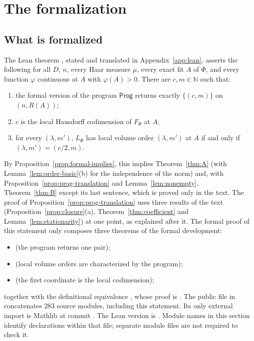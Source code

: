 \documentclass[11pt,a4paper]{article}
\theoremstyle{definition}
\theoremstyle{remark}
\numberwithin{equation}{section}
\newcommand{\N}{\mathbb{N}}
\newcommand{\Prog}{\mathsf{Prog}}
\begin{document}
\section{The formalization}\label{sec:formal}

\subsection{What is formalized}
The Lean theorem , stated and translated in Appendix~\ref{app:lean}, asserts the following for all $D$, $n$, every Haar measure $\mu$, every exact fit $A$ of $\Phi$, and every function $\varphi$ continuous at $A$ with $\varphi(A)>0$. There are $c,m\in\N$ such that:
\begin{enumerate}[label=(F\arabic*)]
\item the formal version of the program $\Prog$ returns exactly $\{(c,m)\}$ on $(n,R(A))$;
\item $c$ is the local Hausdorff codimension of $F_\Phi$ at $A$;
\item for every $(\lambda,m')$, $L_\Phi$ has local volume order $(\lambda,m')$ at $A$ if and only if $(\lambda,m')=(c/2,m)$.
\end{enumerate}
By Proposition~\ref{prop:formal-implies}, this implies Theorem~\ref{thm:A} (with Lemma~\ref{lem:order-basic}(b) for the independence of the norm) and, with Proposition~\ref{prop:prog-translation} and Lemma~\ref{lem:nonempty}, Theorem~\ref{thm:B} except its last sentence, which is proved only in the text. The proof of Proposition~\ref{prop:prog-translation} uses three results of the text (Proposition~\ref{prop:closure}(a), Theorem~\ref{thm:coefficient} and Lemma~\ref{lem:stationarity}) at one point, as explained after it. The formal proof of this statement only composes three theorems of the formal development:
\begin{itemize}
\item {} (the program returns one pair);
\item {} (local volume orders are characterized by the program);
\item {} (the first coordinate is the local codimension);
\end{itemize}
together with the definitional equivalence , whose proof is . The public file  in~\cite{feld-deep} concatenates $283$ source modules, including this statement. Its only external import is Mathlib at commit . The Lean version is . Module names in this section identify declarations within that file; separate module files are not required to check it.
\end{document}
